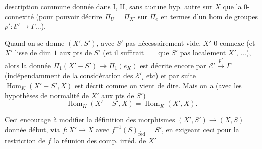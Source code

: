 description commune donnée dans I, II, sans aucune hyp. autre sur $X$ que  la $0$-connexité (pour pouvoir décrire $\Pi_U=\Pi_{X'}$ sur $\Pi_e$ en termes d'un hom de groupes $p':\mathcal E'\longrightarrow\Gamma\ldots$).

Quand on se donne $(X',S')$, avec $S'$ pas nécessairement vide, $X'$ $0$-connexe (et  $X'$ lisse de dim $1$ aux pts de $S'$ (et il suffirait $=$ que $S'$   pas localement  $X'$, $\ldots$),
alors la  donnée
$\Pi_1(X'-S')\longrightarrow\Pi_1(e_K)$ est décrite encore par $\mathcal E'\xrightarrow{p'}\Gamma$ (indépendamment de la considération des $\mathcal E'_i$ etc) et par suite $\operatorname{Hom}_K(X'-S',X)$ est décrit comme on vient de dire.
Mais on a (avec les hypothèses de normalité de $X'$ aux pts de $S'$)
\[
\operatorname{Hom}_K(X'-S',X)=\operatorname{Hom}_K(X',X).
\]

Ceci encourage à modifier la définition des morphismes $(X',S')\longrightarrow(X,S)$ donnée  début, via $f:X'\longrightarrow X$ avec $f^{-1}(S)_{\mathrm{r\acute ed}}=S'$, en exigeant ceci   pour la restriction de $f$  la réunion des comp. irréd. de $X'$
